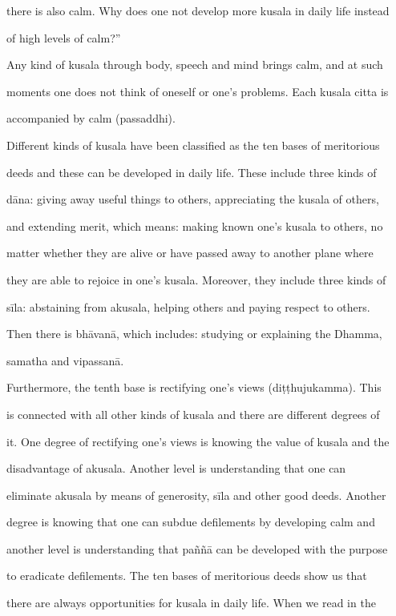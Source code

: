 there is also calm. Why does one not develop more kusala in daily life instead  

of high levels of calm?” 

   Any kind of kusala through body, speech and mind brings calm, and at such  

moments one does not think of oneself or one’s problems. Each kusala citta is  

accompanied by calm  (passaddhi). 

   Different kinds of kusala have been classified as the ten bases of meritorious  

deeds  and these  can be  developed  in  daily life. These  include three kinds  of  

dāna:  giving  away useful things to  others,  appreciating the kusala  of  others,  

and extending merit, which means: making known one’s kusala to others, no  

matter whether  they  are  alive  or have  passed  away  to  another  plane where  

they are able to rejoice in one’s kusala. Moreover, they include three kinds of  

sīla:  abstaining  from  akusala,   helping   others  and  paying  respect  to  others.  

Then there is bhāvanā, which includes:  studying  or  explaining the Dhamma,  

samatha and vipassanā. 

   Furthermore, the tenth base is rectifying one’s views  (diṭṭhujukamma). This  

is connected with all other kinds of kusala and there are different degrees of  

it. One degree of rectifying one’s views is knowing the value of kusala and the  

disadvantage   of   akusala.   Another   level   is   understanding   that   one   can  

eliminate akusala by means of generosity, sīla and other good deeds. Another  

degree  is knowing that  one  can  subdue  defilements by  developing  calm  and  

another level is understanding that paññā can be developed with the purpose  

to  eradicate  defilements.  The  ten  bases   of  meritorious  deeds  show  us  that  

there  are  always  opportunities  for kusala  in  daily  life. When we  read  in the  

